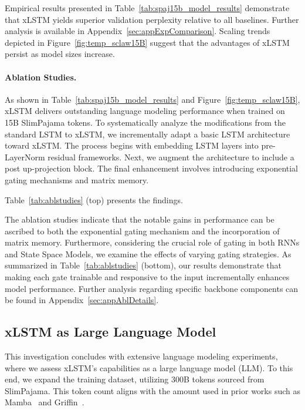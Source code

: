 Empirical results presented in Table~\ref{tab:spaj15b_model_results} demonstrate that xLSTM yields superior validation perplexity relative to all baselines. Further analysis is available in Appendix~\ref{sec:appExpComparison}. Scaling trends depicted in Figure~\ref{fig:temp_sclaw15B} suggest that the advantages of xLSTM persist as model sizes increase.

\paragraph{Ablation Studies.}
As shown in Table~\ref{tab:spaj15b_model_results} and Figure~\ref{fig:temp_sclaw15B}, xLSTM delivers outstanding language modeling performance when trained on 15B SlimPajama tokens. To systematically analyze the modifications from the standard LSTM to xLSTM, we incrementally adapt a basic LSTM architecture toward xLSTM. The process begins with embedding LSTM layers into pre-LayerNorm residual frameworks. Next, we augment the architecture to include a post up-projection block. The final enhancement involves introducing exponential gating mechanisms and matrix memory.

Table~\ref{tab:ablstudies} (top) presents the findings.

The ablation studies indicate that the notable gains in performance can be ascribed to both the exponential gating mechanism and the incorporation of matrix memory. Furthermore, considering the crucial role of gating in both RNNs and State Space Models, we examine the effects of varying gating strategies. As summarized in Table~\ref{tab:ablstudies} (bottom), our results demonstrate that making each gate trainable and responsive to the input incrementally enhances model performance. Further analysis regarding specific backbone components can be found in Appendix~\ref{sec:appAblDetails}.

\subsection{xLSTM as Large Language Model}
\label{sec:ExpLanguage}

This investigation concludes with extensive language modeling experiments, where we assess xLSTM's capabilities as a large language model (LLM). To this end, we expand the training dataset, utilizing 300B tokens sourced from SlimPajama. This token count aligns with the amount used in prior works such as Mamba~\citep{Gu:24arxiv} and Griffin~\citep{De:24arxiv}.


